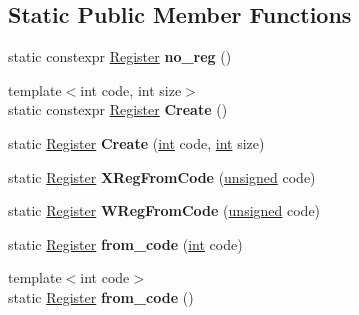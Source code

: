 \subsection*{Static Public Member Functions}
\begin{DoxyCompactItemize}
\item 
\mbox{\label{classv8_1_1internal_1_1Register_af72f1656ce6c0186ea16328bbc55ae9c}} 
static constexpr \mbox{\hyperlink{classv8_1_1internal_1_1Register}{Register}} {\bfseries no\+\_\+reg} ()
\item 
\mbox{\label{classv8_1_1internal_1_1Register_a5f2333ab6c48cad393f5540636c39e68}} 
{\footnotesize template$<$int code, int size$>$ }\\static constexpr \mbox{\hyperlink{classv8_1_1internal_1_1Register}{Register}} {\bfseries Create} ()
\item 
\mbox{\label{classv8_1_1internal_1_1Register_ab523a8bbaef5738cee35dca4b339da08}} 
static \mbox{\hyperlink{classv8_1_1internal_1_1Register}{Register}} {\bfseries Create} (\mbox{\hyperlink{classint}{int}} code, \mbox{\hyperlink{classint}{int}} size)
\item 
\mbox{\label{classv8_1_1internal_1_1Register_a6bc72db8c208ebd60c4fafe95167d380}} 
static \mbox{\hyperlink{classv8_1_1internal_1_1Register}{Register}} {\bfseries X\+Reg\+From\+Code} (\mbox{\hyperlink{classunsigned}{unsigned}} code)
\item 
\mbox{\label{classv8_1_1internal_1_1Register_a38f966f971bdff0ce3230f9bdf3ee84f}} 
static \mbox{\hyperlink{classv8_1_1internal_1_1Register}{Register}} {\bfseries W\+Reg\+From\+Code} (\mbox{\hyperlink{classunsigned}{unsigned}} code)
\item 
\mbox{\label{classv8_1_1internal_1_1Register_a43d9a3408aeddbfafaaf5cccce57ac59}} 
static \mbox{\hyperlink{classv8_1_1internal_1_1Register}{Register}} {\bfseries from\+\_\+code} (\mbox{\hyperlink{classint}{int}} code)
\item 
\mbox{\label{classv8_1_1internal_1_1Register_acc30a2144322720398fa8f5d30530517}} 
{\footnotesize template$<$int code$>$ }\\static \mbox{\hyperlink{classv8_1_1internal_1_1Register}{Register}} {\bfseries from\+\_\+code} ()
\end{DoxyCompactItemize}
